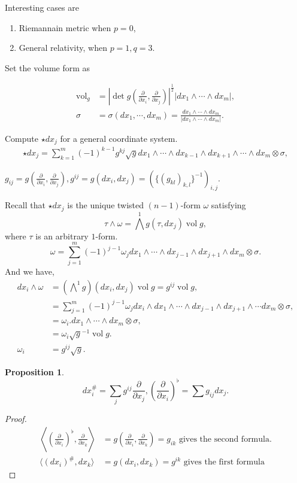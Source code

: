 \documentclass[8pt]{article}
\newtheorem{proposition}{Proposition}[section]
\DeclareMathOperator{\vol}{vol}
\newcommand{\pd}[2]{{\frac {\partial #1} {\partial #2}}}
\begin{document}
Interesting cases are 
\begin{enumerate}
  \item Riemannain metric when $p=0$,
  \item General relativity, when $p=1,q=3$. 
\end{enumerate}

Set the volume form as 

\begin{align*}
  \vol_g & = \left\vert \det g\left(\pd{}{x_i},\pd{}{x_j}\right)\right\vert^{{\frac 1 2}}\vert dx_1\wedge\cdots\wedge dx_m\vert,\\
  \sigma & = \sigma(dx_1,\cdots,dx_m) = {\frac {dx_1\wedge\cdots\wedge dx_m} {\vert dx_1\wedge\cdots\wedge dx_m\vert}}.
\end{align*}

Compute $\star dx_j$ for a general coordinate system.
\begin{align*}
  \star dx_j = \sum_{k=1}^m (-1)^{k-1}g^{kj}\sqrt{g}dx_1\wedge\cdots\wedge dx_{k-1}\wedge dx_{k+1}\wedge\cdots\wedge dx_m\otimes \sigma,
\end{align*}

$g_{ij} = g\left(\pd{}{x_i},\pd{}{x_j}\right),g^{ij} = g(dx_i,dx_j) = (\{(g_{kl})_{k,l}\}^{-1})_{i,j}$.
\par Recall that $\star dx_j$ is the unique twisted $(n-1)$-form $\omega$ satisfying 
\begin{equation*}
  \tau\wedge \omega = \bigwedge^1 g(\tau,dx_j)\vol g,
\end{equation*}
where $\tau$ is an arbitrary $1$-form. 
\begin{equation*}
  \omega = \sum_{j=1}^m(-1)^{j-1}\omega_j dx_1\wedge\cdots\wedge dx_{j-1}\wedge dx_{j+1}\wedge dx_m\otimes\sigma.
\end{equation*}
And we have,
\begin{align*}
  dx_i\wedge\omega & = \left(\bigwedge^1 g\right)(dx_i,dx_j)\vol g = g^{ij}\vol g,\\
  & = \sum_{j=1}^m(-1)^{j-1}\omega_jdx_i\wedge dx_1\wedge\cdots\wedge dx_{j-1}\wedge dx_{j+1}\wedge\cdots dx_m\otimes\sigma,\\
  & = \omega_i. dx_1\wedge\cdots\wedge dx_m\otimes\sigma,\\
  & = \omega_i\sqrt{g}^{-1}\vol g.\\
  \omega_i &= g^{ij}\sqrt{g}.
\end{align*}
\begin{proposition}
  \begin{equation*}
    dx_i^\#=\sum_{j}g^{ij}\pd{}{x_j},\left(\pd{}{x_i}\right)^\flat = \sum g_{ij}dx_j.
  \end{equation*}
\end{proposition}
\begin{proof}
  \begin{align*}
    \left\langle\left(\pd{}{x_i}\right)^\flat,\pd{}{x_k}\right\rangle & = g\left(\pd{}{x_i},\pd{}{x_k}\right) = g_{ik}\text{ gives the second formula}.\\
    \langle (dx_i)^\#,dx_k\rangle &= g(dx_i,dx_k) = g^{ik}\text{ gives the first formula}
  \end{align*}
\end{proof}
\end{document}
